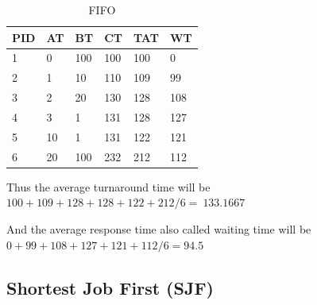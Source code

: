 \documentclass[11pt,a4paper]{article}
\theoremstyle{plain}
\theoremstyle{definition}
\theoremstyle{remark}
\numberwithin{equation}{section}
\begin{document}
\begin{table}[H]
	\centering
	\caption{FIFO}
	\label{t2-fifo}
	\begin{tabular}{llllll}
		\hline
		\multicolumn{1}{|l|}{PID} & \multicolumn{1}{l|}{AT} & \multicolumn{1}{l|}{BT} & \multicolumn{1}{l|}{CT} & \multicolumn{1}{l|}{TAT} & \multicolumn{1}{l|}{WT} \\ \hline
		1                         & 0                       & 100                     & 100                     & 100                      & 0                       \\
		2                         & 1                       & 10                      & 110                     & 109                      & 99                      \\
		3                         & 2                       & 20                      & 130                     & 128                      & 108                     \\
		4                         & 3                       & 1                       & 131                     & 128                      & 127                     \\
		5                         & 10                      & 1                       & 131                     & 122                      & 121                     \\
		6                         & 20                      & 100                     & 232                     & 212                      & 112                    
	\end{tabular}
\end{table}

Thus the average turnaround time will be $100+109+128+128+122+212/6=~133.1667$

And the average response time also called waiting time will be $0+99+108+127+121+112/6=94.5$

\subsection*{Shortest Job First (SJF)}
\end{document}
